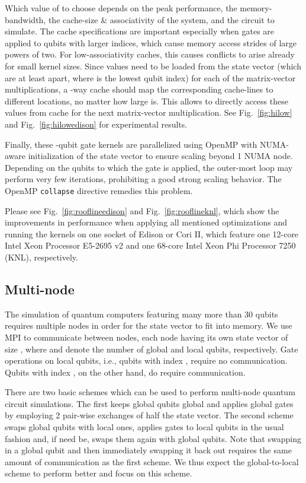 \documentclass[sigconf]{acmart}
\begin{document}
Which value of  to choose depends on the peak performance, the memory-bandwidth, the cache-size \& associativity of the system, and the circuit to simulate. The cache specifications are important especially when gates are applied to qubits with larger indices, which cause memory access strides of large powers of two. For low-associativity caches, this causes conflicts to arise already for small kernel sizes. Since  values need to be loaded from the state vector (which are at least  apart, where  is the lowest qubit index) for each of the  matrix-vector multiplications, a -way cache should map the corresponding cache-lines to different locations, no matter how large  is. This allows to directly access these values from cache for the next matrix-vector multiplication. See Fig.~\ref{fig:hilow} and Fig.~\ref{fig:hilowedison} for experimental results.

Finally, these -qubit gate kernels are parallelized using OpenMP with NUMA-aware initialization of the state vector to ensure scaling beyond 1 NUMA node. Depending on the qubits to which the gate is applied, the outer-most loop may perform very few iterations, prohibiting a good strong scaling behavior. The OpenMP \texttt{collapse} directive remedies this problem.

Please see Fig.~\ref{fig:rooflineedison} and Fig.~\ref{fig:rooflineknl}, which show the improvements in performance when applying all mentioned optimizations and running the kernels on one socket of Edison or Cori II, which feature one 12-core Intel\textregistered{} Xeon\textregistered{} Processor E5-2695 v2 and one 68-core Intel\textregistered{} Xeon Phi\texttrademark{} Processor 7250 (KNL), respectively.

\subsection{Multi-node}\label{sec:multinode}
The simulation of quantum computers featuring many more than 30 qubits requires multiple nodes in order for the state vector to fit into memory. We use MPI to communicate between  nodes, each node having its own state vector of size , where  and  denote the number of global and local qubits, respectively. Gate operations on local qubits, i.e., qubits with index , require no communication. Qubits with index , on the other hand, do require communication.

There are two basic schemes which can be used to perform multi-node quantum circuit simulations. The first \cite{trieu2009large} keeps global qubits global and applies global gates by employing 2 pair-wise exchanges of half the state vector. The second scheme \cite{de2007massively} swaps global qubits with local ones, applies gates to local qubits in the usual fashion and, if need be, swaps them again with global qubits.
Note that swapping in a global qubit and then immediately swapping it back out requires the same amount of communication as the first scheme. We thus expect the global-to-local scheme to perform better and focus on this scheme.
\end{document}

